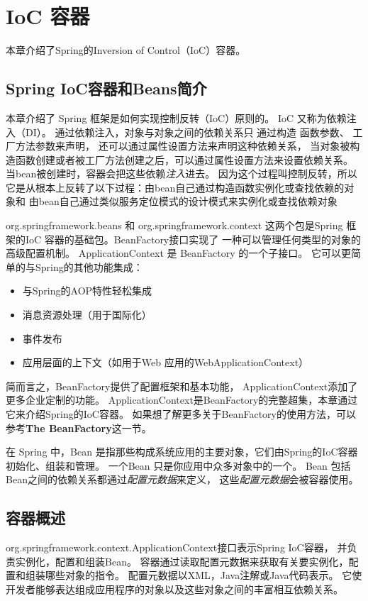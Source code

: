 

\chapter{IoC 容器}
本章介绍了Spring的Inversion of Control（IoC）容器。

\section{Spring IoC容器和Beans简介}
本章介绍了 Spring 框架是如何实现控制反转（IoC）原则的。
IoC 又称为依赖注入（DI）。
通过依赖注入，对象与对象之间的依赖关系只
通过构造
函数参数、
工厂方法参数来声明，
还可以通过属性设置方法来声明这种依赖关系，
当对象被构造函数创建或者被工厂方法创建之后，可以通过属性设置方法来设置依赖关系。
当bean被创建时，容器会把这些依赖\textit{注入}进去。
因为这个过程叫控制反转，所以它是从根本上反转了以下过程：由bean自己通过构造函数实例化或查找依赖的对象和
由bean自己通过类似服务定位模式的设计模式来实例化或查找依赖对象

org.springframework.beans 和 org.springframework.context 
这两个包是Spring 框架的IoC 容器的基础包。BeanFactory接口实现了
一种可以管理任何类型的对象的高级配置机制。
ApplicationContext 是 BeanFactory 的一个子接口。
它可以更简单的与Spring的其他功能集成：

\begin{itemize}
    \item 与Spring的AOP特性轻松集成
    \item 消息资源处理（用于国际化）
    \item 事件发布
    \item 应用层面的上下文（如用于Web 应用的WebApplicationContext）
\end{itemize}

简而言之，BeanFactory提供了配置框架和基本功能，
ApplicationContext添加了更多企业定制的功能。
ApplicationContext是BeanFactory的完整超集，本章通过它来介绍Spring的IoC容器。
如果想了解更多关于BeanFactory的使用方法，可以参考\textbf{The BeanFactory}这一节。

在 Spring 中，Bean 是指那些构成系统应用的主要对象，它们由Spring的IoC容器初始化、组装和管理。
一个Bean 只是你应用中众多对象中的一个。
Bean 包括 Bean之间的依赖关系都通过\textit{配置元数据}来定义，
这些\textit{配置元数据}会被容器使用。

\section{容器概述}
org.springframework.context.ApplicationContext接口表示Spring IoC容器，
并负责实例化，配置和组装Bean。 
容器通过读取配置元数据来获取有关要实例化，配置和组装哪些对象的指令。 
配置元数据以XML，Java注解或Java代码表示。 
它使开发者能够表达组成应用程序的对象以及这些对象之间的丰富相互依赖关系。

